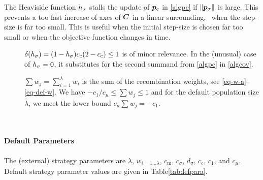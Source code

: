 \documentclass{article} %
\newcommand{\kom}[1]{}
\newcommand{\where}[1]{%
  \begin{description}
  \item[]#1 \vspace{-0.9ex}
  \end{description}
}
\newcommand{\whereende}{\vspace{2ex}~\\}
\newcommand{\ve}[1]{\mathchoice{\mbox{\boldmath$\displaystyle#1$}}
  {\mbox{\boldmath$\textstyle#1$}} {\mbox{\boldmath$\scriptstyle#1$}}
  {\mbox{\boldmath$\scriptscriptstyle#1$}}}
\newcommand{\ma}[1]{\mathchoice{\mbox{\boldmath$\displaystyle#1$}}
  {\mbox{\boldmath$\textstyle#1$}} {\mbox{\boldmath$\scriptstyle#1$}}
  {\mbox{\boldmath$\scriptscriptstyle#1$}}}
\newcommand{\N}{\ensuremath{n}}
\newcommand{\mueff}{\ensuremath{\mu_\mathrm{eff}}}
\newcommand{\sumw}[1][j]{\ensuremath{{\textstyle\sum{\!w_{#1}}}}}
\newcommand{\alphamuminus}{\ensuremath{\alpha_{\mu}^{-}}}
\newcommand{\summ}[2]{\sum_{#1=1}^{#2}}
\newcommand{\lam}{\ensuremath{\lambda}}
\newcommand{\sig}{\ensuremath{\sigma}}
\newcommand{\Cg}{\ensuremath{\ma{C}^{(g)}}}
\newcommand{\cc}{\ensuremath{c_\mathrm{c}}}
\newcommand{\pc}{\ve{p}_\mathrm{c}}
\newcommand{\cs}{c_\sig}
\newcommand{\ds}{d_\sig}
\newcommand{\ps}{\ve{p}_\sig}
\newcommand{\cm}{\ensuremath{c_\mathrm{m}}}%
\newcommand{\cone}{\ensuremath{c_1}}
\newcommand{\cmu}{\ensuremath{c_\mu}}
\renewcommand{\whereende}{\vspace{1ex}~\\}
\newcommand{\nref}[1]{\nolinebreak[4]\hspace{0.2845em plus0.05em minus0.17em}\nolinebreak[4]\ref{#1}}
\begin{document}
\begin{appendix}
{%
  The Heaviside function $\Hsig$ stalls the update of $\pc$ in
  \eqref{algpc} if $\|\ps\|$ is large. This prevents a too fast
  increase of axes of $\C$ in a linear surrounding, \ie\ when the
  step-size is far too small. This is useful when the initial
  step-size is chosen far too small or when the objective function
  changes in time. }
%
\kom{\where{$\Cg$, symmetric and positive definite $\N\times\N$ covariance
  matrix. } }
%
\where{$\delta(\Hsig)=(1-\Hsig)\cc(2-\cc)\le 1$ is of minor
  relevance. In the (unusual) case of $\Hsig=0$, it substitutes for
  the second summand from \eqref{algpc} in \eqref{algcov}.}
%
\where{$\sumw=\sum_{i=1}^\lam w_i$ is the sum of the recombination weights, see \eqref{eq-w-a}--\eqref{eq-def-w}. We have $-\cone/\cmu \le\sumw\le 1$ and for the default population size $\lam$, we meet the lower bound $\cmu\sumw=-\cone$.%
%
}
\whereende
\newpage

\newcommand{\alphamueffminus}{\ensuremath{\alpha_{\mueff}^-}}
\newcommand{\alphaposdef}{\ensuremath{\alpha_\mathrm{pos\,def}^-}}
\paragraph{Default Parameters}
The (external) strategy parameters are $\lam$, $w_{i=1\dots\lam}$, $\cm$,
$\cs$, {$\ds$}, {$\cc$}, $\cone$, and {$\cmu$}. {Default
strategy parameter values} are given in Table\nref{tabdefpara}.
%
\begin{table}
\caption{\label{tabdefpara}Default Parameters (in 2016), where 
  $\mu=|\{w_i>0\}|=\lfloor\lam/2\rfloor$,
  $\mueff=\frac{(\summ{i}{\mu}\wia)^2}{\summ{i}{\mu}\wia^2}\in[1, \mu]$, 
  $\mueffminus=\frac{(\sum_{i=\mu+1}^{\lam}\wia)^2}{\sum_{i=\mu+1}^{\lam}\wia^2}$,
  $\summ{i}{\mu}w_i=1$, and $\possum{w_j}$ is the sum
  of all positive, and $-\negsum{w_j}$ the sum of all negative $w_j$-values, 
  i.e., $\alphamuminus=\negsum{\wb_j}\ge0$.
  Apart from $w_i$ for $i>\mu$, all parameters are taken from \cite{Hansen:2009} 
  with only minor modifications
}


\end{table}
\end{appendix}
\end{document}
